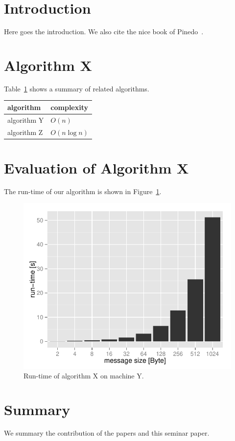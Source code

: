 
\section{Introduction}

Here goes the introduction. We also cite the nice book of Pinedo~\cite{Pinedo:2008vs}.

\section{Algorithm X}

Table~\ref{tab:related_algorithms} shows a summary of related algorithms.

\begin{table}[t]
\centering
{}
\label{tab:related_algorithms}
\begin{tabular}{ll}
\toprule 
algorithm & complexity \\
\midrule
algorithm Y & $O(n)$ \\
algorithm Z & $O(n \log{n} )$ \\
\bottomrule
\end{tabular}
\end{table}

\section{Evaluation of Algorithm X}

The run-time of our algorithm is shown in Figure~\ref{fig:runtime}.

\begin{figure}[t]
\centering
\includegraphics[width=.5\linewidth]{figures/runtime}
\caption{Run-time of algorithm X on machine Y.}
\label{fig:runtime}
\end{figure}

\section{Summary}
We summary the contribution of the papers and this seminar paper.
